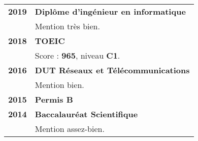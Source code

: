 \begin{supertabular}{rl}
    \textbf{2019} & \textbf{Diplôme d'ingénieur en informatique}\\
    & Mention très bien.\\[1.5ex]
    \textbf{2018} & \textbf{TOEIC}\\
    & Score : \textbf{965}, niveau \textbf{C1}.\\[1.5ex]
    \textbf{2016} & \textbf{DUT R\'eseaux et T\'el\'ecommunications}\\
    & Mention bien.\\[1.5ex]
    \textbf{2015} & \textbf{Permis B}\\[1.5ex]
    \textbf{2014} & \textbf{Baccalaur\'eat Scientifique}\\
    & Mention assez-bien.\\
\end{supertabular}

\medskip
